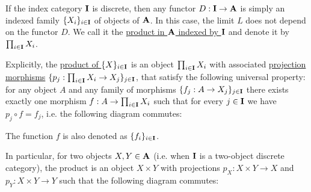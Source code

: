 \begin{definition}\label{def:categorical_product}\cite[definition 5.1.1, 5.1.7]{Leinster2014}
  If the index category $\operatorname{\mathbf{I}}$ is discrete, then any functor $D: \operatorname{\mathbf{I}} \to \operatorname{\mathbf{A}}$ is simply an indexed family $\{ X_i \}_{i \in \operatorname{\mathbf{I}}}$ of objects of $\operatorname{\mathbf{A}}$. In this case, the limit $L$ does not depend on the functor $D$. We call it the \uline{product in $\operatorname{\mathbf{A}}$ indexed by $\operatorname{\mathbf{I}}$} and denote it by $\prod_{i \in \operatorname{\mathbf{I}}} X_i$.

  Explicitly, the \uline{product of $\{ X \}_{i \in \operatorname{\mathbf{I}}}$} is an object $\prod_{i \in \operatorname{\mathbf{I}}} X_i$ with associated \uline{projection morphisms} $\{ p_j: \prod_{i \in \operatorname{\mathbf{I}}} X_i \to X_j \}_{j \in \operatorname{\mathbf{I}}}$, that satisfy the following universal property: for any object $A$ and any family of morphisms $\{ f_j: A \to {X_j} \}_{j \in \operatorname{\mathbf{I}}}$ there exists exactly one morphism $f: A \to \prod_{i \in \operatorname{\mathbf{I}}} X_i$ such that for every $j \in \operatorname{\mathbf{I}}$ we have $p_j \circ f = f_j$, i.e. the following diagram commutes:
  \begin{center}
  \end{center}

  The function $f$ is also denoted as $\{ f_i \}_{i \in \operatorname{\mathbf{I}}}$.

  In particular, for two objects $X, Y \in \operatorname{\mathbf{A}}$ (i.e. when $\operatorname{\mathbf{I}}$ is a two-object discrete category), the product is an object $X \times Y$ with projections $p_X: X \times Y \to X$ and $p_Y: X \times Y \to Y$ such that the following diagram commutes:
  \begin{center}
  \end{center}
\end{definition}

